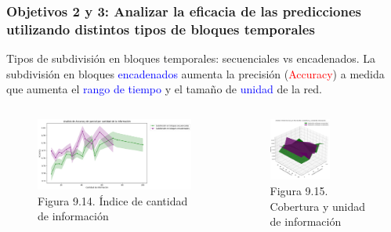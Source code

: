 \documentclass{beamer}
\begin{document}
\begin{frame}
	\frametitle{Objetivos 2 y 3: Analizar la eficacia de las predicciones utilizando distintos tipos de bloques temporales}
\begin{block}{Tipos de subdivisión en bloques temporales: secuenciales vs encadenados.}
	La subdivisión en bloques \textcolor{blue}{encadenados} aumenta la precisión (\textcolor{red}{Accuracy}) a medida que aumenta el \textcolor{blue}{rango de tiempo} y el tamaño de \textcolor{blue}{unidad} de la red.
	\end{block}
	

	\begin{columns}[c]
	\begin{column}{.5\textwidth}
		\begin{figure}
			\centering
			\includegraphics[width=1\textwidth]{figs/cap7/figura_17}
\caption{Figura 9.14. Índice de cantidad de información}
		\end{figure}      
	\end{column}
	\begin{column}{.5\textwidth}
		\begin{figure}
			\centering
			\includegraphics[width=0.6\textwidth]{figs/cap7/figura_18}
			\caption{Figura 9.15. Cobertura y unidad de información}
		\end{figure}
	\end{column}
\end{columns}
	
\end{frame}
\end{document}
